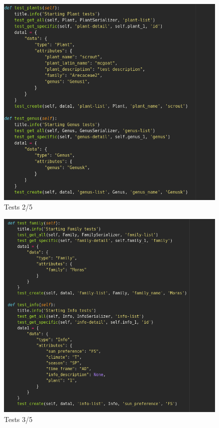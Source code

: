 \documentclass{article}
\begin{document}
\begin{center}
       \begin{figure}[!htb]
           \centering
           \caption{Tests 2/5}
           \includegraphics[scale=0.50]{tests2}
       \end{figure}
       
       \begin{figure}[!htb]
           \centering
           \caption{Tests 3/5}
           \includegraphics[scale=0.50]{test3}
       \end{figure}
       

\end{center}
\end{document}
